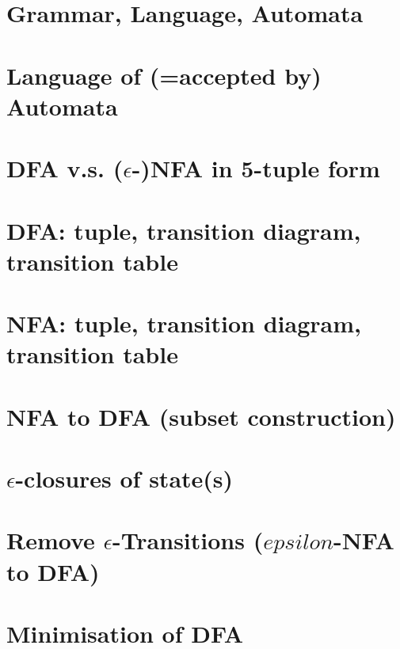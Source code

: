 \documentclass[10pt,a4paper,landscape]{article}
\begin{document}
\pagestyle{empty}

\begin{multicols*}{3}

\section*{Grammar, Language, Automata}


\section*{Language of (=accepted by) Automata}


\section*{DFA v.s. (\(\epsilon\)-)NFA in 5-tuple form}


\section*{DFA: tuple, transition diagram, transition table}


\section*{NFA: tuple, transition diagram, transition table}


\section*{NFA to DFA (subset construction)}


\section*{\(\epsilon\)-closures of state(s)}


\section*{Remove \(\epsilon\)-Transitions (\(epsilon\)-NFA to DFA)}


\section*{Minimisation of DFA}



\end{multicols*}
\end{document}
